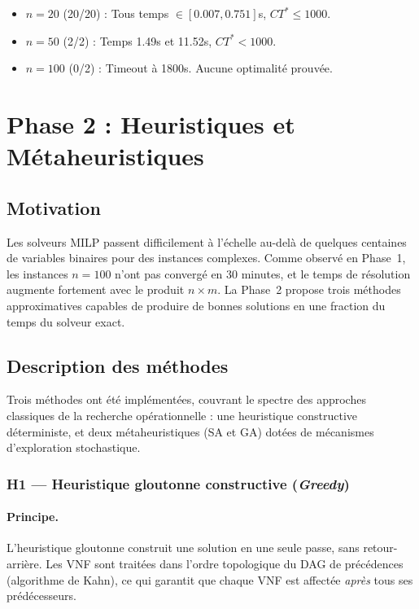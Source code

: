 \documentclass{article}
\begin{document}
\begin{center}
\end{center}

\begin{itemize}
    \item $n=20$ (20/20) : Tous temps $\in [0.007, 0.751]$s, $CT^* \le 1000$.
    \item $n=50$ (2/2) : Temps 1.49s et 11.52s, $CT^* < 1000$.
    \item $n=100$ (0/2) : Timeout à 1800s. Aucune optimalité prouvée.
\end{itemize}

\section{Phase 2 : Heuristiques et Métaheuristiques}

\subsection{Motivation}

Les solveurs MILP passent difficilement à l'échelle au-delà de quelques centaines
de variables binaires pour des instances complexes. Comme observé en Phase~1, les
instances $n=100$ n'ont pas convergé en 30 minutes, et le temps de résolution
augmente fortement avec le produit $n \times m$. La Phase~2 propose trois méthodes
approximatives capables de produire de bonnes solutions en une fraction du temps
du solveur exact.

\subsection{Description des méthodes}

Trois méthodes ont été implémentées, couvrant le spectre des approches classiques
de la recherche opérationnelle : une heuristique constructive déterministe, et deux
métaheuristiques (SA et GA) dotées de mécanismes d'exploration stochastique.

\subsubsection{H1 --- Heuristique gloutonne constructive (\textit{Greedy})}

\paragraph{Principe.}
L'heuristique gloutonne construit une solution en une seule passe, sans
retour-arrière. Les VNF sont traitées dans l'ordre topologique du DAG de
précédences (algorithme de Kahn), ce qui garantit que chaque VNF est affectée
\emph{après} tous ses prédécesseurs.
\end{document}
